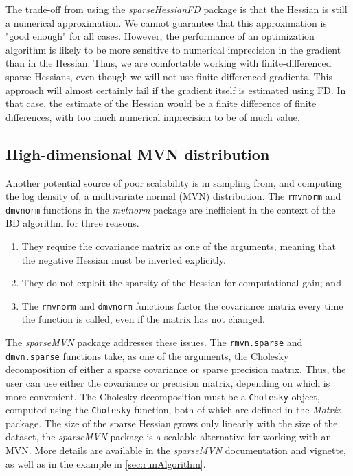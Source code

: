 \documentclass[10pt]{article}\usepackage[]{graphicx}\usepackage[]{color}
\newcommand{\pkg}[1]{\emph{#1}}
\newcommand{\func}[1]{\texttt{#1}}
\newcommand{\class}[1]{\texttt{#1}}
\begin{document}
The trade-off from using the \pkg{sparseHessianFD} package is that the
Hessian is still a numerical approximation.  We cannot guarantee that
this approximation is "good enough" for all cases.  However, the
performance of an optimization algorithm is likely to be more sensitive to
numerical imprecision in the gradient than in the Hessian. Thus, we
are comfortable working with finite-differenced sparse Hessians, even though
we will not use finite-differenced gradients.  This approach will
almost certainly fail if the gradient itself is estimated using FD.
In that case, the estimate of the Hessian would be a finite difference of finite
differences, with too much numerical imprecision to be of much
value.


\subsection{High-dimensional MVN distribution}\label{sec:MVN}

Another potential source of poor scalability is in sampling from, and
computing the log density of, a multivariate normal (MVN)
distribution. The \func{rmvnorm} and \func{dmvnorm} functions in the
\pkg{mvtnorm} package \citep{R_mvtnorm} are inefficient
in the context of the BD algorithm for three reasons.

\begin{enumerate}
\item They require the covariance matrix as one of the arguments, meaning that
the negative Hessian must be inverted explicitly.
\item They do not
exploit the sparsity of the Hessian for computational gain; and
\item The \func{rmvnorm} and \func{dmvnorm} functions factor the
  covariance matrix every time the function is called, even if the matrix has not changed.
\end{enumerate}

The \pkg{sparseMVN} package addresses these issues.  The \func{rmvn.sparse} and
\func{dmvn.sparse} functions take, as one of the arguments, the Cholesky
decomposition of either a sparse covariance or sparse precision
matrix.  Thus, the user can use either the covariance
or precision matrix, depending on which is more convenient.  The
Cholesky decomposition must be a \class{Cholesky} object, computed
using the \func{Cholesky} function, both of which are defined in the
\pkg{Matrix} package.  The size
of the sparse Hessian grows only linearly with the size of the
dataset, the \pkg{sparseMVN} package is a scalable alternative for working
with an MVN.  More details are available in the \pkg{sparseMVN}
documentation and vignette, as well as in the example in \ref{sec:runAlgorithm}.
\end{document}
